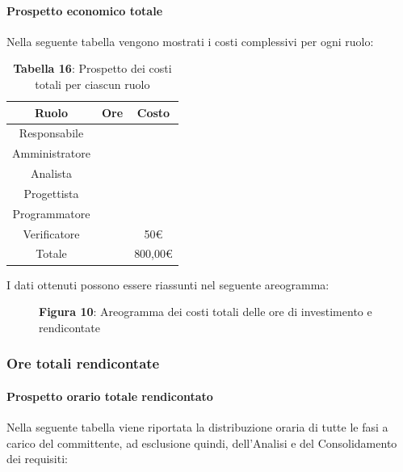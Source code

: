 \paragraph{Prospetto economico totale}
Nella seguente tabella vengono mostrati i costi complessivi per ogni ruolo:

\begin{table}[H]
	\centering
	\renewcommand{\arraystretch}{1.5}
	\begin{tabular}{|c|c|c|}
		\hline
		\rowcolor{lighter-grayer}
		Ruolo & Ore & Costo \\
		\hline
		Responsabile &  &  \\
		\hline
		Amministratore &  &  \\
		\hline
		Analista &  &  \\
		\hline
		Progettista&  &  \\
		\hline
		Programmatore &  &  \\
		\hline
		Verificatore &  & 50\euro \\
		\hline
		Totale &  &  800,00\euro \\
		\hline
	\end{tabular}
	\caption*{\textbf{Tabella 16}: Prospetto dei costi totali per ciascun ruolo \\}
\end{table}

I dati ottenuti possono essere riassunti nel seguente areogramma:


\begin{figure}[!h]
	\centering
	\caption*{\textbf{Figura 10}: Areogramma dei costi totali delle ore di investimento e rendicontate}
    \label{fig:Figura10}
\end{figure}

\subsubsection{Ore totali rendicontate}
\paragraph{Prospetto orario totale rendicontato}
Nella seguente tabella viene riportata la distribuzione oraria di tutte le fasi a carico del committente, ad esclusione quindi, dell'Analisi e del Consolidamento dei requisiti:

